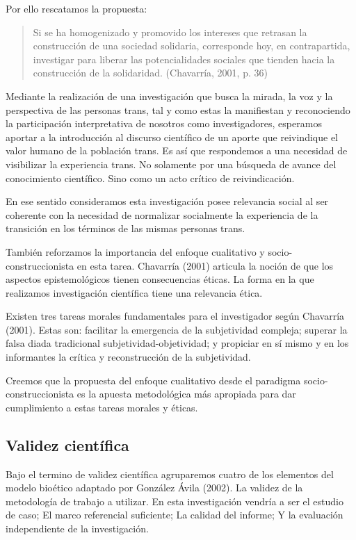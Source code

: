 Por ello rescatamos la propuesta:

\begin{quote}
    Si se ha homogenizado y promovido los intereses que retrasan la construcción de
    una sociedad solidaria, corresponde hoy, en contrapartida, investigar para
    liberar las potencialidades sociales que tienden hacia la construcción de la
    solidaridad. (Chavarría, 2001, p. 36)
\end{quote}

Mediante la realización de una investigación que busca la mirada,
la voz y la perspectiva de las personas trans, tal y como estas la
manifiestan y reconociendo la participación interpretativa de nosotros como
investigadores, esperamos aportar a la introducción al discurso científico de
un aporte que reivindique el valor humano de la población trans.
Es así que respondemos a una necesidad de visibilizar la experiencia trans.
No solamente por una búsqueda de avance del conocimiento científico.
Sino como un acto crítico de reivindicación.

En ese sentido consideramos esta investigación posee relevancia social al ser
coherente con la necesidad de normalizar socialmente la experiencia de la
transición en los términos de las mismas personas trans.

También reforzamos la importancia del enfoque cualitativo y
socio-construccionista en esta tarea.
Chavarría (2001) articula la noción de que los aspectos epistemológicos
tienen consecuencias éticas.
La forma en la que realizamos investigación científica tiene una relevancia
ética.

Existen tres tareas morales fundamentales para el investigador según
Chavarría (2001).
Estas son: facilitar la emergencia de la subjetividad compleja;
superar la falsa diada tradicional subjetividad-objetividad;
y propiciar en sí mismo y en los informantes la crítica y reconstrucción de
la subjetividad.

Creemos que la propuesta del enfoque cualitativo desde el paradigma
socio-construccionista es la apuesta metodológica más apropiada para dar
cumplimiento a estas tareas morales y éticas.

\subsection{Validez científica}
Bajo el termino de validez científica agruparemos cuatro de los elementos del
modelo bioético adaptado por González Ávila (2002).
La validez de la metodología de trabajo a utilizar.
En esta investigación vendría a ser el estudio de caso;
El marco referencial suficiente;
La calidad del informe;
Y la evaluación independiente de la investigación.


